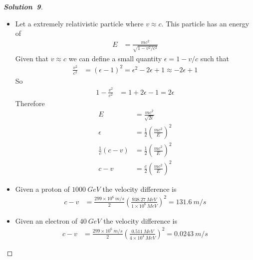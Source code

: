 \documentclass[11pt]{article}
\newcommand{\sci}[1]{\times 10^{#1}}
\theoremstyle{definition}
\renewcommand*{\proofname}{\bf{Solution}}
\begin{document}
\cleardoublepage
\begin{proof}[\proofname\ 9]\leavevmode\par
\begin{itemize}
\item [(a)] Let a extremely relativistic particle where $v \approx c$.
This particle has an energy of
\begin{align*}
    E &= \frac{mc^2}{\sqrt{1 - v^2/c^2}}
\end{align*}
Given that $v \approx c$ we can define a small quantity $\epsilon = 1 - v/c$
such that 
\begin{align*}
    \frac{v^2}{c^2} &= (\epsilon - 1)^2 = \epsilon^2 - 2\epsilon + 1 \approx - 2\epsilon + 1
\end{align*}
So
\begin{align*}
    1 - \frac{v^2}{c^2} &= 1 + 2\epsilon - 1 = 2\epsilon
\end{align*}
Therefore
\begin{align*}
    E &= \frac{mc^2}{\sqrt{2\epsilon}} \\
    \epsilon &= \frac{1}{2}\left(\frac{mc^2}{E}\right)^2 \\
    \frac{1}{c}(c - v)
    &= \frac{1}{2}\left(\frac{mc^2}{E}\right)^2 \\
    c - v
    &= \frac{c}{2}\left(\frac{mc^2}{E}\right)^2
\end{align*}
\item [(b)] Given a proton of $1000~GeV$ the velocity difference is
\begin{align*}
    c - v
    &= \frac{299\sci{6}~m/s}{2}\left(\frac{938.27~MeV}{1\sci{6}~MeV}\right)^2
    = 131.6~m/s
\end{align*}
\item [(c)] Given an electron of $40~GeV$ the velocity difference is
\begin{align*}
    c - v
    &= \frac{299\sci{6}~m/s}{2}\left(\frac{0.511~MeV}{4\sci{4}~MeV}\right)^2
    = 0.0243~m/s
\end{align*}
\end{itemize}
\end{proof}
\end{document}
